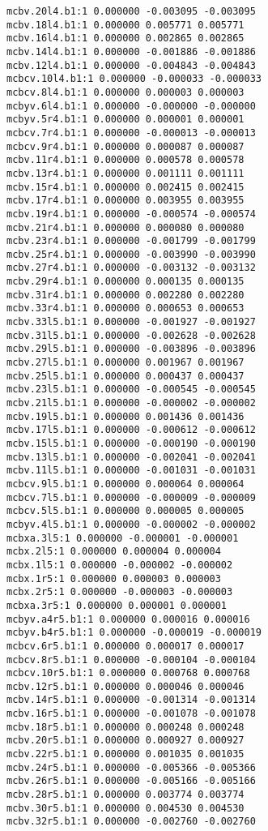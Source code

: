 \begin{verbatim}
mcbv.20l4.b1:1 0.000000 -0.003095 -0.003095
mcbv.18l4.b1:1 0.000000 0.005771 0.005771
mcbv.16l4.b1:1 0.000000 0.002865 0.002865
mcbv.14l4.b1:1 0.000000 -0.001886 -0.001886
mcbv.12l4.b1:1 0.000000 -0.004843 -0.004843
mcbcv.10l4.b1:1 0.000000 -0.000033 -0.000033
mcbcv.8l4.b1:1 0.000000 0.000003 0.000003
mcbyv.6l4.b1:1 0.000000 -0.000000 -0.000000
mcbyv.5r4.b1:1 0.000000 0.000001 0.000001
mcbcv.7r4.b1:1 0.000000 -0.000013 -0.000013
mcbcv.9r4.b1:1 0.000000 0.000087 0.000087
mcbv.11r4.b1:1 0.000000 0.000578 0.000578
mcbv.13r4.b1:1 0.000000 0.001111 0.001111
mcbv.15r4.b1:1 0.000000 0.002415 0.002415
mcbv.17r4.b1:1 0.000000 0.003955 0.003955
mcbv.19r4.b1:1 0.000000 -0.000574 -0.000574
mcbv.21r4.b1:1 0.000000 0.000080 0.000080
mcbv.23r4.b1:1 0.000000 -0.001799 -0.001799
mcbv.25r4.b1:1 0.000000 -0.003990 -0.003990
mcbv.27r4.b1:1 0.000000 -0.003132 -0.003132
mcbv.29r4.b1:1 0.000000 0.000135 0.000135
mcbv.31r4.b1:1 0.000000 0.002280 0.002280
mcbv.33r4.b1:1 0.000000 0.000653 0.000653
mcbv.33l5.b1:1 0.000000 -0.001927 -0.001927
mcbv.31l5.b1:1 0.000000 -0.002628 -0.002628
mcbv.29l5.b1:1 0.000000 -0.003896 -0.003896
mcbv.27l5.b1:1 0.000000 0.001967 0.001967
mcbv.25l5.b1:1 0.000000 0.000437 0.000437
mcbv.23l5.b1:1 0.000000 -0.000545 -0.000545
mcbv.21l5.b1:1 0.000000 -0.000002 -0.000002
mcbv.19l5.b1:1 0.000000 0.001436 0.001436
mcbv.17l5.b1:1 0.000000 -0.000612 -0.000612
mcbv.15l5.b1:1 0.000000 -0.000190 -0.000190
mcbv.13l5.b1:1 0.000000 -0.002041 -0.002041
mcbv.11l5.b1:1 0.000000 -0.001031 -0.001031
mcbcv.9l5.b1:1 0.000000 0.000064 0.000064
mcbcv.7l5.b1:1 0.000000 -0.000009 -0.000009
mcbcv.5l5.b1:1 0.000000 0.000005 0.000005
mcbyv.4l5.b1:1 0.000000 -0.000002 -0.000002
mcbxa.3l5:1 0.000000 -0.000001 -0.000001
mcbx.2l5:1 0.000000 0.000004 0.000004
mcbx.1l5:1 0.000000 -0.000002 -0.000002
mcbx.1r5:1 0.000000 0.000003 0.000003
mcbx.2r5:1 0.000000 -0.000003 -0.000003
mcbxa.3r5:1 0.000000 0.000001 0.000001
mcbyv.a4r5.b1:1 0.000000 0.000016 0.000016
mcbyv.b4r5.b1:1 0.000000 -0.000019 -0.000019
mcbcv.6r5.b1:1 0.000000 0.000017 0.000017
mcbcv.8r5.b1:1 0.000000 -0.000104 -0.000104
mcbcv.10r5.b1:1 0.000000 0.000768 0.000768
mcbv.12r5.b1:1 0.000000 0.000046 0.000046
mcbv.14r5.b1:1 0.000000 -0.001314 -0.001314
mcbv.16r5.b1:1 0.000000 -0.001078 -0.001078
mcbv.18r5.b1:1 0.000000 0.000248 0.000248
mcbv.20r5.b1:1 0.000000 0.000927 0.000927
mcbv.22r5.b1:1 0.000000 0.001035 0.001035
mcbv.24r5.b1:1 0.000000 -0.005366 -0.005366
mcbv.26r5.b1:1 0.000000 -0.005166 -0.005166
mcbv.28r5.b1:1 0.000000 0.003774 0.003774
mcbv.30r5.b1:1 0.000000 0.004530 0.004530
mcbv.32r5.b1:1 0.000000 -0.002760 -0.002760

\end{verbatim}
